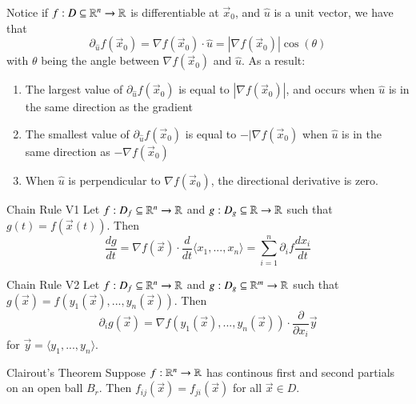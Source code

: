 \documentclass[12pt]{report}
\begin{document}
\begin{appendices}
    \begin{thm}{}{}
        Notice if $f:D\subseteq \mathbb R^n\rightarrow \mathbb R$ is differentiable at $\vec{x}_0$, and $\hat{u}$ is a unit vector, we have that \begin{equation}
            \partial_{\hat{u}}f(\vec{x}_0) = \nabla f(\vec{x}_0) \cdot \hat{u} = |\nabla f(\vec{x}_0)|\cos(\theta)
        \end{equation}
        with $\theta$ being the angle between $\nabla f(\vec{x}_0)$ and $\hat{u}$. As a result: \begin{enumerate}
            \item The largest value of $\partial_{\hat{u}}f(\vec{x}_0)$ is equal to $|\nabla f(\vec{x}_0)|$, and occurs when $\hat{u}$ is in the same direction as the gradient
            \item The smallest value of $\partial_{\hat{u}}f(\vec{x}_0)$ is equal to $-|\nabla f(\vec{x}_0)$ when $\hat{u}$ is in the same direction as $-\nabla f(\vec{x}_0)$
            \item When $\hat{u}$ is perpendicular to $\nabla f(\vec{x}_0)$, the directional derivative is zero.
        \end{enumerate}
    \end{thm}

    \begin{thm}{Chain Rule V1}{}
        Let $f:D_f\subseteq \mathbb R^n\rightarrow \mathbb R$ and $g:D_g\subseteq \mathbb R\rightarrow \mathbb R$ such that $g(t) = f(\vec{x}(t))$. Then \begin{equation}
            \frac{dg}{dt} = \nabla f(\vec{x}) \cdot \frac{d}{dt}\langle x_1,...,x_n\rangle = \sum_{i=1}^n \partial_i f\frac{dx_i}{dt}
        \end{equation}
    \end{thm}

    \begin{thm}{Chain Rule V2}{}
        Let $f:D_f\subseteq \mathbb R^n\rightarrow \mathbb R$ and $g:D_g\subseteq \mathbb R^m\rightarrow \mathbb R$ such that $g(\vec{x}) = f(y_1(\vec{x}),...,y_n(\vec{x}))$. Then \begin{equation}
        \partial_i g(\vec{x}) = \nabla f(y_1(\vec{x}),...,y_n(\vec{x})) \cdot \frac{\partial}{\partial x_i}\vec{y}
        \end{equation}
        for $\vec{y} = \langle y_1,...,y_n\rangle$.
    \end{thm}


    \begin{thm}{Clairout's Theorem}{}
        Suppose $f:\mathbb R^n\rightarrow \mathbb R$ has continous first and second partials on an open ball $B_r$. Then $f_{ij}(\vec{x}) = f_{ji}(\vec{x})$ for all $\vec{x} \in D$.
    \end{thm}



\end{appendices}
\end{document}
